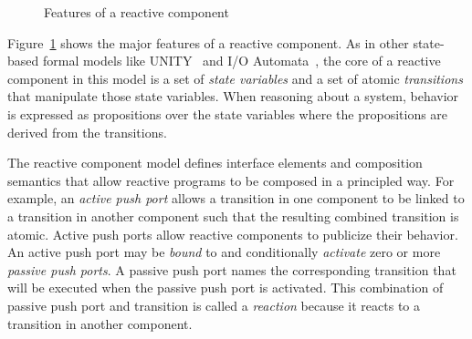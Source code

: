 \def\rppush[#1,#2,#3,#4,#5,#6]#7{
  \draw [fill=white] (#1,#2) -- ++(${#4*.5}*(1,0) + {#4*.5}*(0,-1)$) -- ++($#3*(-1,0)$) -- ++($#4*(0,1)$) -- ++($#3*(1,0)$) -- cycle;
  \node (#5) at (#1,#2) {};
  \node (#6) at ($(#1,#2) + {#3 - .5*#4}*(-1,0)$) {};
  \node [left] at (#1,#2) {#7};
}

\def\rapull[#1,#2,#3,#4,#5,#6]#7{
  \draw [fill=lightgray] (#1,#2) -- ++(${#4*.5}*(1,0) + {#4*.5}*(0,-1)$) -- ++($#3*(-1,0)$) -- ++($#4*(0,1)$) -- ++($#3*(1,0)$) -- cycle;
  \node (#5) at (#1,#2) {};
  \node (#6) at ($(#1,#2) + {#3 - .5*#4}*(-1,0)$) {};
  \node [left] at (#1,#2) {#7};
}

\begin{figure}[H]
\centering
\resizebox{\textwidth}{!}{%
\begingroup
\fontsize{10pt}{12pt}\selectfont

\endgroup
}%
\caption{Features of a reactive component\label{reactive_component}}
\end{figure}

Figure~\ref{reactive_component} shows the major features of a reactive component.
As in other state-based formal models like UNITY~\cite{chandy1989parallel} and I/O Automata~\cite{nancy1996distributed}, the core of a reactive component in this model is a set of \emph{state variables} and a set of atomic \emph{transitions} that manipulate those state variables.
When reasoning about a system, behavior is expressed as propositions over the state variables where the propositions are derived from the transitions.


The reactive component model defines interface elements and composition semantics that allow reactive programs to be composed in a principled way.
For example, an \emph{active push port} allows a transition in one component to be linked to a transition in another component such that the resulting combined transition is atomic.
Active push ports allow reactive components to publicize their behavior.
An active push port may be \emph{bound} to and conditionally \emph{activate} zero or more \emph{passive push ports}.
A passive push port names the corresponding transition that will be executed when the passive push port is activated.
This combination of passive push port and transition is called a \emph{reaction} because it reacts to a transition in another component.

